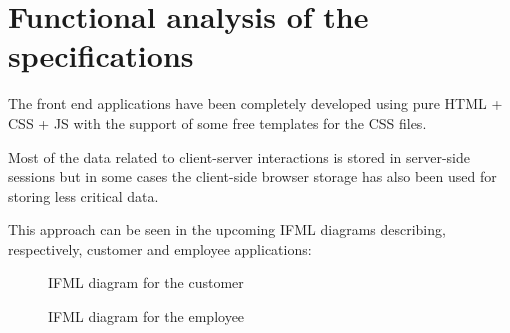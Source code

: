 
\chapter{Functional analysis of the specifications}

The front end applications have been completely developed using pure HTML + CSS + JS with the support of some free templates for the CSS files.

Most of the data related to client-server interactions is stored in server-side sessions but in some cases the client-side browser storage has also been used for storing less critical data.

This approach can be seen in the upcoming IFML diagrams describing, respectively, customer and employee applications:

\begin{landscape}
    \thispagestyle{landscape}
    \begin{figure}[!htbp]
        \vspace*{-2\oddsidemargin}
        \centerline{}
        \caption{IFML diagram for the customer}
        \label{fig:ifml_diagram_customer}
        \vspace{-100pt}
    \end{figure}
\end{landscape}

\begin{landscape}
    \thispagestyle{landscape}
    \begin{figure}[p]
        \vspace*{-2\oddsidemargin}
        \centerline{}
        \caption{IFML diagram for the employee}
        \label{fig:ifml_diagram_employee}
    \end{figure}
\end{landscape}